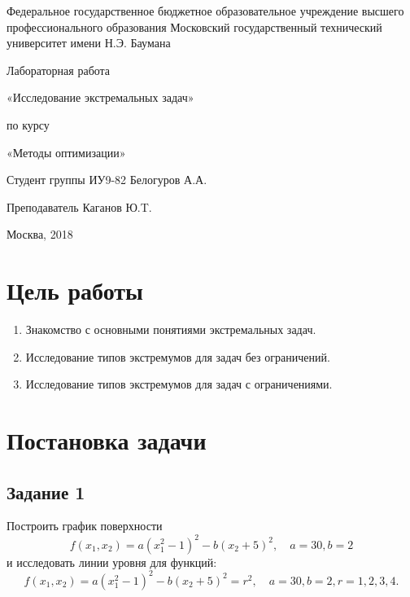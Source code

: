 \documentclass[a4paper, 12pt]{article}   	%
\begin{document}
\begin{titlepage}

\thispagestyle{empty}

\begin{center}
Федеральное государственное бюджетное образовательное учреждение высшего профессионального образования Московский государственный технический университет имени Н.Э. Баумана
\end{center}


\vfill

\centerline{\large{Лабораторная работа}}

\centerline{\large{«Исследование экстремальных задач»}}

\centerline{\large{по курсу}}
\centerline{\large{«Методы оптимизации»}}


\vfill

Студент группы ИУ9-82 \hfill Белогуров А.А.

Преподаватель \hfill Каганов Ю.T.
\vfill

\centerline{Москва, 2018}
\clearpage
\end{titlepage}

\newpage
\setcounter{page}{2}

\tableofcontents

\newpage

\section{Цель работы}

\begin{enumerate}
    \item Знакомство с основными понятиями экстремальных задач.
    \item Исследование типов экстремумов для задач без ограничений.
    \item Исследование типов экстремумов для задач с ограничениями.
\end{enumerate}

\newpage

\section{Постановка задачи}

    \subsection{Задание 1}
    Построить график поверхности
    \begin{equation*}
        f(x_1, x_2) = a (x^2_1-1)^2 - b(x_2+5)^2, \quad a= 30, b = 2
    \end{equation*}
    и исследовать линии уровня для функций:
    \begin{equation*}
        f(x_1, x_2) = a (x^2_1-1)^2 - b(x_2+5)^2 = r^2, \quad a= 30, b = 2, r = 1,2,3,4.
    \end{equation*}
\end{document}
